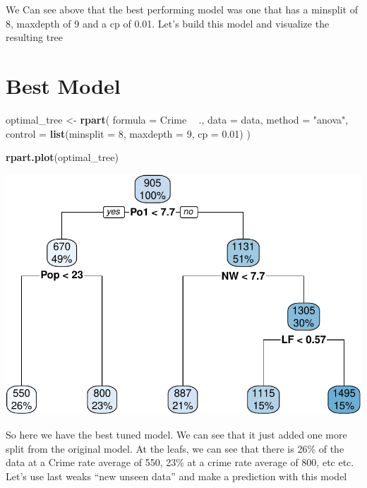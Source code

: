 \documentclass[]{article}
\newenvironment{Shaded}{\begin{snugshade}}{\end{snugshade}}
\newcommand{\KeywordTok}[1]{\textcolor[rgb]{0.13,0.29,0.53}{\textbf{#1}}}
\newcommand{\DataTypeTok}[1]{\textcolor[rgb]{0.13,0.29,0.53}{#1}}
\newcommand{\DecValTok}[1]{\textcolor[rgb]{0.00,0.00,0.81}{#1}}
\newcommand{\FloatTok}[1]{\textcolor[rgb]{0.00,0.00,0.81}{#1}}
\newcommand{\StringTok}[1]{\textcolor[rgb]{0.31,0.60,0.02}{#1}}
\newcommand{\OperatorTok}[1]{\textcolor[rgb]{0.81,0.36,0.00}{\textbf{#1}}}
\newcommand{\NormalTok}[1]{#1}
\begin{document}
We Can see above that the best performing model was one that has a
minsplit of 8, maxdepth of 9 and a cp of 0.01. Let's build this model
and visualize the resulting tree

\section{Best Model}\label{best-model}

\begin{Shaded}
\begin{Highlighting}[]
\NormalTok{optimal_tree <-}\StringTok{ }\KeywordTok{rpart}\NormalTok{(}
    \DataTypeTok{formula =}\NormalTok{ Crime }\OperatorTok{~}\StringTok{ }\NormalTok{.,}
    \DataTypeTok{data    =}\NormalTok{ data,}
    \DataTypeTok{method  =} \StringTok{"anova"}\NormalTok{,}
    \DataTypeTok{control =} \KeywordTok{list}\NormalTok{(}\DataTypeTok{minsplit =} \DecValTok{8}\NormalTok{, }\DataTypeTok{maxdepth =} \DecValTok{9}\NormalTok{, }\DataTypeTok{cp =} \FloatTok{0.01}\NormalTok{)}
\NormalTok{    )}

\KeywordTok{rpart.plot}\NormalTok{(optimal_tree)}
\end{Highlighting}
\end{Shaded}

\includegraphics{HW7_files/figure-latex/unnamed-chunk-9-1.pdf}

So here we have the best tuned model. We can see that it just added one
more split from the original model. At the leafs, we can see that there
is 26\% of the data at a Crime rate average of 550, 23\% at a crime rate
average of 800, etc etc. Let's use last weaks ``new unseen data'' and
make a prediction with this model
\end{document}
